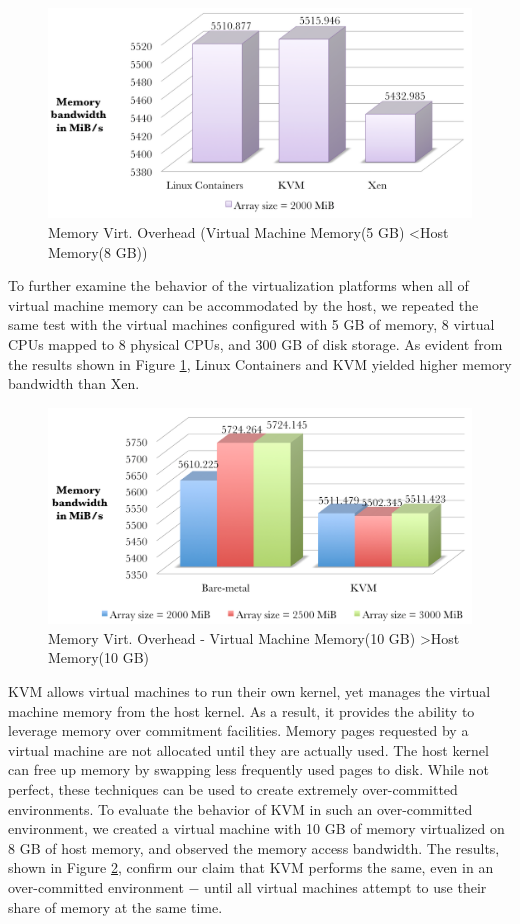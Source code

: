\begin{figure}[H]
\centering
\includegraphics[width=130mm]{mem2.png}
\caption{Memory Virt. Overhead (Virtual Machine Memory(5 GB) \textless  Host Memory(8 GB))}
\label{fig:mem2}
\end{figure}


To further examine the behavior of the virtualization platforms when all of virtual machine memory can be accommodated by the host, we repeated the same test with the virtual machines configured with 5 GB of memory, 8 virtual CPUs mapped to 8 physical CPUs, and 300 GB of disk storage. As evident from the results shown in Figure \ref{fig:mem2}, Linux Containers and KVM yielded higher memory bandwidth than Xen.

\begin{figure}[H]
\centering
\includegraphics[width=130mm]{mem3.png}
\caption{Memory Virt. Overhead - Virtual Machine Memory(10 GB) \textgreater  Host Memory(10 GB)}
\label{fig:mem3}
\end{figure}

KVM allows virtual machines to run their own kernel, yet manages the virtual machine memory from the host kernel. As a result, it provides the ability to leverage memory over commitment facilities. Memory pages requested by a virtual machine are not allocated until they are actually used. The host kernel can free up memory by swapping less frequently used pages to disk. While not perfect, these techniques can be used to create extremely over-committed environments. To evaluate the behavior of KVM in such an over-committed environment, we created a virtual machine with 10 GB of memory virtualized on 8 GB of host memory, and observed the memory access bandwidth. The results, shown in Figure \ref{fig:mem3}, confirm our claim that KVM performs the same, even in an over-committed environment $-$ until all virtual machines attempt to use their share of memory at the same time. 



